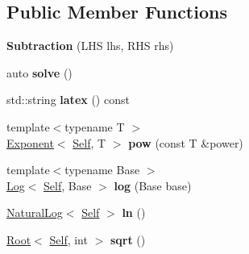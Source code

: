 \subsection*{Public Member Functions}
\begin{DoxyCompactItemize}
\item 
\hypertarget{classlatex_1_1math_1_1Subtraction_a26f15fee14c611cbc0fff0fb95c859b6}{{\bfseries Subtraction} (L\-H\-S lhs, R\-H\-S rhs)}\label{classlatex_1_1math_1_1Subtraction_a26f15fee14c611cbc0fff0fb95c859b6}

\item 
\hypertarget{classlatex_1_1math_1_1Subtraction_a36b9f0987e23d1b8ed9f624c7e7ca48f}{auto {\bfseries solve} ()}\label{classlatex_1_1math_1_1Subtraction_a36b9f0987e23d1b8ed9f624c7e7ca48f}

\item 
\hypertarget{classlatex_1_1math_1_1Subtraction_aa4ab82319d568a41353492cb84ab6296}{std\-::string {\bfseries latex} () const }\label{classlatex_1_1math_1_1Subtraction_aa4ab82319d568a41353492cb84ab6296}

\item 
\hypertarget{classlatex_1_1math_1_1Subtraction_ac7814b9c8feddad2aa3254ac7bee6088}{{\footnotesize template$<$typename T $>$ }\\\hyperlink{classlatex_1_1math_1_1Exponent}{Exponent}$<$ \hyperlink{classlatex_1_1math_1_1Subtraction}{Self}, T $>$ {\bfseries pow} (const T \&power)}\label{classlatex_1_1math_1_1Subtraction_ac7814b9c8feddad2aa3254ac7bee6088}

\item 
\hypertarget{classlatex_1_1math_1_1Subtraction_a5929a366cb0133508d844d46bd4d947c}{{\footnotesize template$<$typename Base $>$ }\\\hyperlink{classlatex_1_1math_1_1Log}{Log}$<$ \hyperlink{classlatex_1_1math_1_1Subtraction}{Self}, Base $>$ {\bfseries log} (Base base)}\label{classlatex_1_1math_1_1Subtraction_a5929a366cb0133508d844d46bd4d947c}

\item 
\hypertarget{classlatex_1_1math_1_1Subtraction_a10ffdc2e6c00dd8dabd03ac85f5ffce2}{\hyperlink{classlatex_1_1math_1_1NaturalLog}{Natural\-Log}$<$ \hyperlink{classlatex_1_1math_1_1Subtraction}{Self} $>$ {\bfseries ln} ()}\label{classlatex_1_1math_1_1Subtraction_a10ffdc2e6c00dd8dabd03ac85f5ffce2}

\item 
\hypertarget{classlatex_1_1math_1_1Subtraction_a87372721888d73e25d80db1bc09a42ea}{\hyperlink{classlatex_1_1math_1_1Root}{Root}$<$ \hyperlink{classlatex_1_1math_1_1Subtraction}{Self}, int $>$ {\bfseries sqrt} ()}\label{classlatex_1_1math_1_1Subtraction_a87372721888d73e25d80db1bc09a42ea}

\end{DoxyCompactItemize}
